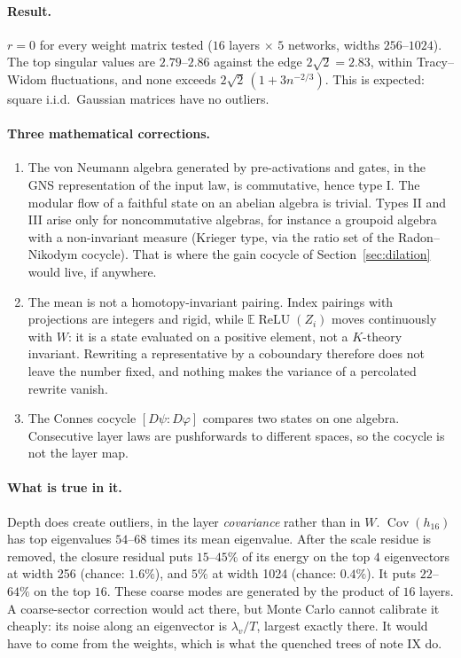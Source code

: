 \documentclass[11pt]{article}
\theoremstyle{definition}
\theoremstyle{remark}
\newcommand{\E}{\mathbb E}
\newcommand{\Cov}{\operatorname{Cov}}
\newcommand{\relu}{\operatorname{ReLU}}
\begin{document}
\paragraph{Result.} $r=0$ for every weight matrix tested ($16$ layers $\times$ $5$ networks, widths $256$--$1024$). The top singular values are $2.79$--$2.86$ against the edge $2\sqrt2=2.83$, within Tracy--Widom fluctuations, and none exceeds $2\sqrt2\,(1+3n^{-2/3})$. This is expected: square i.i.d.\ Gaussian matrices have no outliers.

\paragraph{Three mathematical corrections.}
\begin{enumerate}
\item The von Neumann algebra generated by pre-activations and gates, in the GNS representation of the input law, is commutative, hence type I. The modular flow of a faithful state on an abelian algebra is trivial. Types II and III arise only for noncommutative algebras, for instance a groupoid algebra with a non-invariant measure (Krieger type, via the ratio set of the Radon--Nikodym cocycle). That is where the gain cocycle of Section~\ref{sec:dilation} would live, if anywhere.
\item The mean is not a homotopy-invariant pairing. Index pairings with projections are integers and rigid, while $\E\relu(Z_i)$ moves continuously with $W$: it is a state evaluated on a positive element, not a $K$-theory invariant. Rewriting a representative by a coboundary therefore does not leave the number fixed, and nothing makes the variance of a percolated rewrite vanish.
\item The Connes cocycle $[D\psi:D\varphi]$ compares two states on one algebra. Consecutive layer laws are pushforwards to different spaces, so the cocycle is not the layer map.
\end{enumerate}

\paragraph{What is true in it.} Depth does create outliers, in the layer \emph{covariance} rather than in $W$. $\Cov(h_{16})$ has top eigenvalues $54$--$68$ times its mean eigenvalue. After the scale residue is removed, the closure residual puts $15$--$45\%$ of its energy on the top $4$ eigenvectors at width 256 (chance: $1.6\%$), and $5\%$ at width 1024 (chance: $0.4\%$). It puts $22$--$64\%$ on the top $16$. These coarse modes are generated by the product of $16$ layers. A coarse-sector correction would act there, but Monte Carlo cannot calibrate it cheaply: its noise along an eigenvector is $\lambda_v/T$, largest exactly there. It would have to come from the weights, which is what the quenched trees of note IX do.
\end{document}
